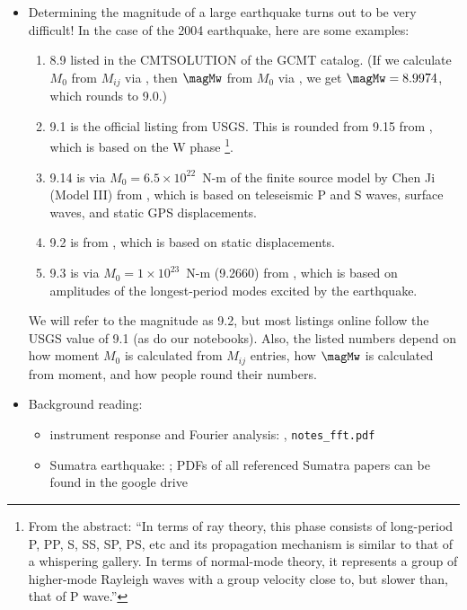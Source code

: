 \documentclass[11pt,titlepage,fleqn]{article}
\begin{document}
\begin{itemize}

\item Determining the magnitude of a large earthquake turns out to be very difficult! In the case of the 2004 earthquake, here are some examples:
%
\begin{enumerate}
\item 8.9 listed in the CMTSOLUTION of the GCMT catalog. (If we calculate $M_0$ from $M_{ij}$ via \citet{SilverJordan1982}, then $\magMw$ from $M_0$ via \citet{Kanamori1977}, we get $\magMw = 8.9974$, which rounds to 9.0.)

\item 9.1 is the official listing from USGS. This is rounded from 9.15 from \citet{Duputel2012Wphase}, which is based on the W phase \citep{Kanamori1993}\footnote{From the abstract: ``In terms of ray theory, this phase consists of long-period P, PP, S, SS, SP, PS, etc and its propagation mechanism is similar to that of a whispering gallery. In terms of normal-mode theory, it represents a group of higher-mode Rayleigh waves with a group velocity close to, but slower than, that of P wave.''}.

\item 9.14 is via $M_0 = 6.5 \times 10^{22}$~N-m of the finite source model by Chen Ji (Model III) from \citet{Ammon2005}, which is based on teleseismic P and S waves, surface waves, and static GPS displacements.

\item 9.2 is from \citet{Banerjee2005}, which is based on static displacements.

\item 9.3 is via $M_0 = 1 \times 10^{23}$~N-m (9.2660) from \citet{SSteinOkal2005}, which is based on amplitudes of the longest-period modes excited by the earthquake.
\end{enumerate}
%
We will refer to the magnitude as 9.2, but most listings online follow the USGS value of 9.1 (as do our notebooks). Also, the listed numbers depend on how moment $M_0$ is calculated from $M_{ij}$ entries, how $\magMw$ is calculated from moment, and how people round their numbers.

\item Background reading:

\begin{itemize}
\item instrument response and Fourier analysis: \citet[][Ch.~6]{SteinWysession}, \verb+notes_fft.pdf+
\item Sumatra earthquake: \citep{Lay2005,Ammon2005,Park2005,Ni2005}; PDFs of all referenced Sumatra papers can be found in the google drive
\end{itemize}


\end{itemize}
\end{document}
